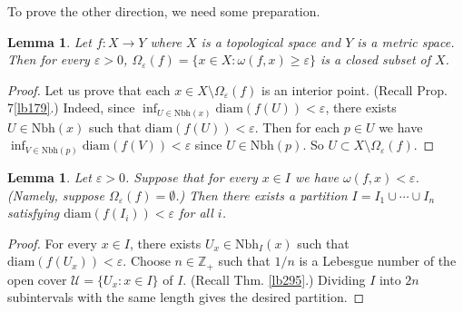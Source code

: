 \documentclass[12pt,b5paper,notitlepage]{article}
\theoremstyle{definition}
\theoremstyle{plain}
\newtheorem{lm}[df]{Lemma}
\newcommand{\mc}{\mathcal}
\newcommand{\Zbb}{\mathbb Z}
\newcommand{\Nbh}{\mathrm{Nbh}}
\newcommand{\diam}{\mathrm{diam}}
\newcommand{\eps}{\varepsilon}
\numberwithin{equation}{section}
\begin{document}
To prove the other direction, we need some preparation.


\begin{lm}\label{lb414}
Let $f:X\rightarrow Y$ where $X$ is a topological space and $Y$ is a metric space. Then for every $\eps>0$, $\Omega_\eps(f)=\{x\in X:\omega(f,x)\geq\eps\}$ is a closed subset of $X$.
\end{lm}

\begin{proof}
Let us prove that each $x\in X\setminus\Omega_\eps(f)$ is an interior point. (Recall Prop. 7\ref{lb179}.) Indeed, since $\inf_{U\in\Nbh(x)}\diam(f(U))<\eps$, there exists $U\in\Nbh(x)$ such that $\diam(f(U))<\eps$. Then for each $p\in U$ we have $\inf_{V\in\Nbh(p)}\diam(f(V))<\eps$ since $U\in\Nbh(p)$. So $U\subset X\setminus\Omega_\eps(f)$.
\end{proof}



\begin{lm}\label{lb415}
Let $\eps>0$. Suppose that for every $x\in I$ we have $\omega(f,x)<\eps$. (Namely, suppose $\Omega_\eps(f)=\emptyset$.) Then there exists a partition $I=I_1\cup\cdots\cup I_n$ satisfying $\diam(f(I_i))<\eps$ for all $i$.
\end{lm}


\begin{proof}
For every $x\in I$, there exists $U_x\in\Nbh_I(x)$ such that $\diam(f(U_x))<\eps$. Choose $n\in\Zbb_+$ such that $1/n$ is a Lebesgue number of the open cover $\mc U=\{U_x:x\in I\}$ of $I$. (Recall Thm. \ref{lb295}.) Dividing $I$ into $2n$ subintervals with the same length gives the desired partition.
\end{proof}
\end{document}
